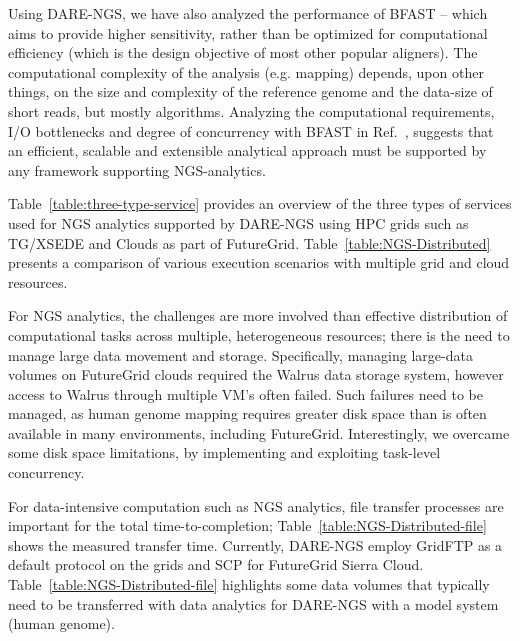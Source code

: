 \documentclass[]{svjour3}
\begin{document}
Using DARE-NGS, we have also analyzed the performance of BFAST --
which aims to provide higher sensitivity, rather than be optimized for
computational efficiency (which is the design objective of most other
popular aligners).  The computational complexity of the analysis
(e.g. mapping) depends, upon other things, on the size and complexity
of the reference genome and the data-size of short reads, but mostly
algorithms. Analyzing the computational requirements, I/O bottlenecks
and degree of concurrency with BFAST in Ref.~\cite{dare-ecmls11},
suggests that an efficient, scalable and extensible analytical
approach must be supported by any framework supporting NGS-analytics.

Table~\ref{table:three-type-service} provides an overview of the three
types of services used for NGS analytics supported by DARE-NGS using
HPC grids such as TG/XSEDE and Clouds as part of
FutureGrid\cite{dare-ecmls11}.  Table~\ref{table:NGS-Distributed}
presents a comparison of various execution scenarios with multiple
grid and cloud resources.

For NGS analytics, the challenges are more involved than effective
distribution of computational tasks across multiple, heterogeneous
resources; there is the need to manage large data movement and
storage.  Specifically, managing large-data volumes on FutureGrid
clouds required the Walrus data storage system\cite{walrusurl}, however access to Walrus through
multiple VM's often failed.  Such failures need to be managed, as
human genome mapping requires greater disk space than is often
available in many environments, including FutureGrid. Interestingly,
we overcame some disk space limitations, by implementing and
exploiting task-level concurrency.


For data-intensive computation such as NGS analytics, file transfer
processes are important for the total time-to-completion;
Table~\ref{table:NGS-Distributed-file} shows the measured transfer
time. Currently, DARE-NGS employ GridFTP as a default protocol on the
grids and SCP for FutureGrid Sierra Cloud.
Table~\ref{table:NGS-Distributed-file} highlights some data volumes
that typically need to be transferred with data analytics for DARE-NGS
with a model system (human genome).
\end{document}
